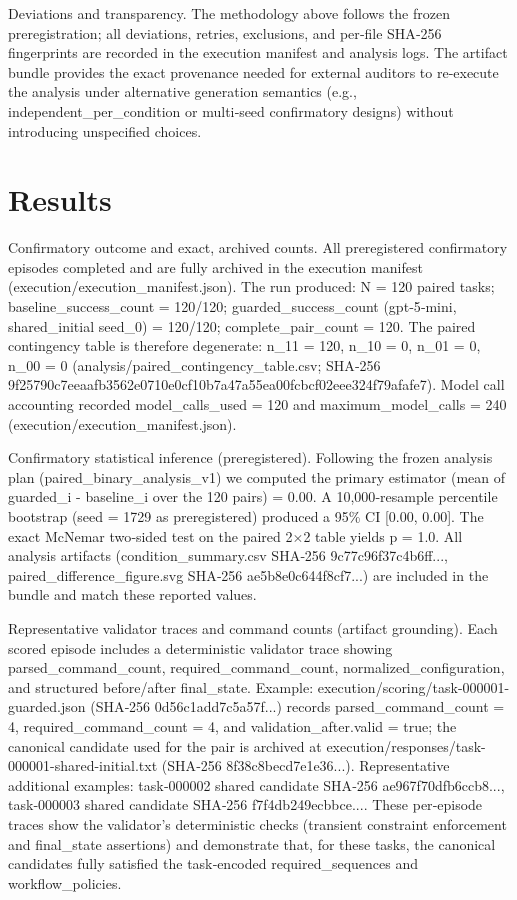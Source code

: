 \documentclass[conference]{IEEEtran}
\begin{document}
Deviations and transparency. The methodology above follows the frozen preregistration; all deviations, retries, exclusions, and per‑file SHA‑256 fingerprints are recorded in the execution manifest and analysis logs. The artifact bundle provides the exact provenance needed for external auditors to re‑execute the analysis under alternative generation semantics (e.g., independent\_per\_condition or multi‑seed confirmatory designs) without introducing unspecified choices.

\section{Results}
Confirmatory outcome and exact, archived counts. All preregistered confirmatory episodes completed and are fully archived in the execution manifest (execution/execution\_manifest.json). The run produced: N = 120 paired tasks; baseline\_success\_count = 120/120; guarded\_success\_count (gpt‑5‑mini, shared\_initial seed\_0) = 120/120; complete\_pair\_count = 120. The paired contingency table is therefore degenerate: n\_11 = 120, n\_10 = 0, n\_01 = 0, n\_00 = 0 (analysis/paired\_contingency\_table.csv; SHA‑256 9f25790c7eeaafb3562e0710e0cf10b7a47a55ea00fcbcf02eee324f79afafe7). Model call accounting recorded model\_calls\_used = 120 and maximum\_model\_calls = 240 (execution/execution\_manifest.json).

Confirmatory statistical inference (preregistered). Following the frozen analysis plan (paired\_binary\_analysis\_v1) we computed the primary estimator (mean of guarded\_i - baseline\_i over the 120 pairs) = 0.00. A 10,000‑resample percentile bootstrap (seed = 1729 as preregistered) produced a 95\% CI [0.00, 0.00]. The exact McNemar two‑sided test on the paired 2\ensuremath{\times}2 table yields p = 1.0. All analysis artifacts (condition\_summary.csv SHA‑256 9c77c96f37c4b6ff..., paired\_difference\_figure.svg SHA‑256 ae5b8e0c644f8cf7...) are included in the bundle and match these reported values.

Representative validator traces and command counts (artifact grounding). Each scored episode includes a deterministic validator trace showing parsed\_command\_count, required\_command\_count, normalized\_configuration, and structured before/after final\_state. Example: execution/scoring/task-000001-guarded.json (SHA‑256 0d56c1add7c5a57f...) records parsed\_command\_count = 4, required\_command\_count = 4, and validation\_after.valid = true; the canonical candidate used for the pair is archived at execution/responses/task-000001-shared-initial.txt (SHA‑256 8f38c8becd7e1e36...). Representative additional examples: task‑000002 shared candidate SHA‑256 ae967f70dfb6ccb8..., task‑000003 shared candidate SHA‑256 f7f4db249ecbbce.... These per‑episode traces show the validator's deterministic checks (transient constraint enforcement and final\_state assertions) and demonstrate that, for these tasks, the canonical candidates fully satisfied the task‑encoded required\_sequences and workflow\_policies.
\end{document}
